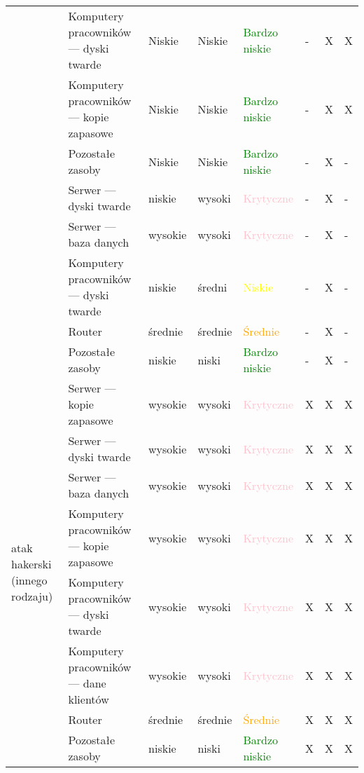 \begin{landscape}
\begin{longtable}[ht!]{|m{4cm}|m{6cm}|m{4.5cm}|m{2.5cm}|m{2.5cm}|m{0.5cm}|m{0.5cm}|m{0.5cm}|}
		& Komputery pracowników --- dyski twarde & Niskie & Niskie & \textcolor{green}{Bardzo niskie} & - & X & X  \\ \cline{2-8}
		& Komputery pracowników --- kopie zapasowe & Niskie & Niskie & \textcolor{green}{Bardzo niskie} & - & X & X  \\ \cline{2-8}
		& Pozostałe zasoby & Niskie & Niskie & \textcolor{green}{Bardzo niskie} & - & X & -  \\
		\hline
		\newpage
		\hline
		\multirow{4}{4cm}{atak DDoS}
		& Serwer --- dyski twarde & niskie  & wysoki & \textcolor{pink}{Krytyczne} & - & X & -  \\ \cline{2-8}
		& Serwer --- baza danych & wysokie & wysoki & \textcolor{pink}{Krytyczne} & - & X & -  \\ \cline{2-8} 
		& Komputery pracowników --- dyski twarde  & niskie  & średni & \textcolor{yellow}{Niskie} & - & X & -  \\ \cline{2-8}
		& Router & średnie  & średnie & \textcolor{orange}{Średnie} & - & X & -  \\ \cline{2-8} 
		& Pozostałe zasoby & niskie  & niski & \textcolor{green}{Bardzo niskie} & - & X & -  \\
		\hline
		\multirow{8}{4cm}{atak hakerski \linebreak (innego rodzaju)}
		& Serwer --- kopie zapasowe  & wysokie & wysoki & \textcolor{pink}{Krytyczne} & X & X & X  \\ \cline{2-8}
		& Serwer --- dyski twarde & wysokie  & wysoki & \textcolor{pink}{Krytyczne} & X & X & X  \\ \cline{2-8}
		& Serwer --- baza danych & wysokie & wysoki & \textcolor{pink}{Krytyczne} & X & X & X  \\ \cline{2-8}
		& Komputery pracowników --- kopie zapasowe & wysokie & wysoki & \textcolor{pink}{Krytyczne} & X & X & X  \\ \cline{2-8}
		& Komputery pracowników --- dyski twarde  & wysokie  & wysoki & \textcolor{pink}{Krytyczne}& X & X & X  \\ \cline{2-8}
		& Komputery pracowników --- dane klientów & wysokie & wysoki & \textcolor{pink}{Krytyczne} & X & X & X  \\ \cline{2-8}
		& Router & średnie  & średnie & \textcolor{orange}{Średnie} & X & X & X  \\ \cline{2-8}
		& Pozostałe zasoby & niskie  & niski & \textcolor{green}{Bardzo niskie} & X & X & X  \\
		\hline
	\end{longtable}
\end{landscape}



